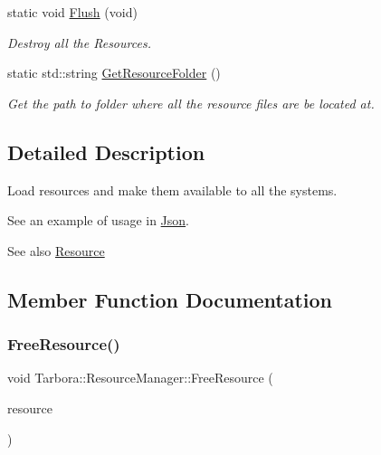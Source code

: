 \begin{DoxyCompactItemize}
\mbox{\label{classTarbora_1_1ResourceManager_aaef7ce514df5baa069b870aa69d9626e}} 
static void \hyperlink{classTarbora_1_1ResourceManager_aaef7ce514df5baa069b870aa69d9626e}{Flush} (void)
\begin{DoxyCompactList}\small\item\em Destroy all the Resources. \end{DoxyCompactList}\item 
\mbox{\label{classTarbora_1_1ResourceManager_a302419fdf0455a322394fcd7fb754593}} 
static std\+::string \hyperlink{classTarbora_1_1ResourceManager_a302419fdf0455a322394fcd7fb754593}{Get\+Resource\+Folder} ()
\begin{DoxyCompactList}\small\item\em Get the path to folder where all the resource files are be located at. \end{DoxyCompactList}\end{DoxyCompactItemize}


\subsection{Detailed Description}
Load resources and make them available to all the systems. 

See an example of usage in \hyperlink{classTarbora_1_1Json}{Json}. \begin{DoxySeeAlso}{See also}
\hyperlink{classTarbora_1_1Resource}{Resource} 
\end{DoxySeeAlso}


\subsection{Member Function Documentation}
\mbox{\label{classTarbora_1_1ResourceManager_a7267c1da4dc124b41f34b6c870fdb10e}} 
\subsubsection{\texorpdfstring{Free\+Resource()}{FreeResource()}}
{\footnotesize\ttfamily void Tarbora\+::\+Resource\+Manager\+::\+Free\+Resource (\begin{DoxyParamCaption}\item[{Resource\+Ptr}]{resource }\end{DoxyParamCaption})\hspace{0.3cm}{\ttfamily [static]}}



